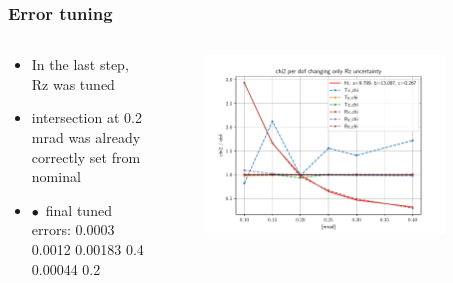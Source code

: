 \documentclass[aspectratio=1610, 12pt]{beamer}
\begin{document}
\begin{frame}\frametitle{Error tuning}
  \begin{columns}
    \begin{column}[c]{0.4\textwidth}
      \begin{itemize}
        \item In the last step, Rz was tuned
        \item intersection at 0.2 mrad was already correctly set from nominal
        \item $\bullet$\, final tuned errors: 0.0003 0.0012 0.00183 0.4 0.00044 0.2
      \end{itemize}
    \end{column}
    \begin{column}[c]{0.6\textwidth}
      \begin{figure}
        \includegraphics[width=0.9\textwidth]{plots/retest/only_Rz_variable_full_fit.pdf}
      \end{figure}
    \end{column}
  \end{columns}
\end{frame}
\end{document}
